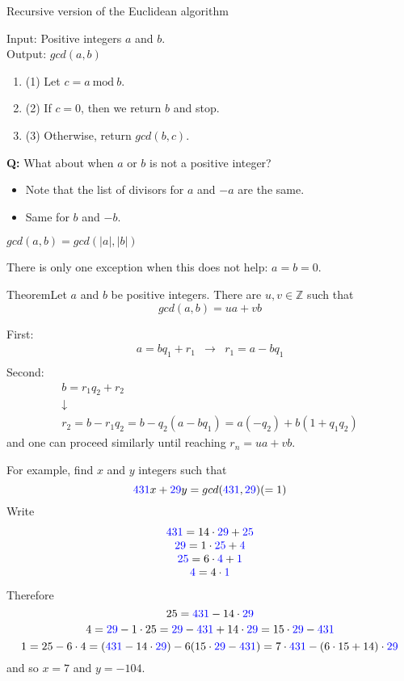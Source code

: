 \documentclass{beamer}
\def\bl[#1]#2{\begin{block}{#1}#2\end{block}}
\def\enumb{\begin{enumerate}}
\def\enume{\end{enumerate}}
\def\itemb{\begin{itemize}}
\def\iteme{\end{itemize}}
\def\mod{~\textrm{mod}~}
\begin{document}
\begin{frame}{Recursive version of the Euclidean algorithm}
\bl[]{
Input: Positive integers $a$ and $b$.\\
Output: $gcd(a,b)$
\enumb
\item[(1)] Let $c= a\mod b$.
\item[(2)] If $c=0$, then we return $b$ and stop.
\item[(3)] Otherwise, return $gcd(b,c)$.
\enume}

\textbf{Q:} What about when $a$ or $b$ is not a positive integer?
\itemb
\item Note that the list of divisors for $a$ and $-a$ are the same.
\item Same for $b$ and $-b$. 
\iteme
\bl[]{$gcd(a,b)=gcd(|a|,|b|)$}
There is only one exception when this does not help: $a=b=0$.
\end{frame}

\begin{frame}
\bl[Theorem]{Let $a$ and $b$ be positive integers. There are $u,v\in\mathbb{Z}$ such that 
\[
gcd(a,b)=ua+vb
\]}
First:
\[
\begin{array}{cccc}
a=bq_1+r_1&\to&r_1=a-bq_1\\
\end{array}
\]
Second:
\[
\begin{array}{c}
b=r_1q_2+r_2\\
\downarrow\\
r_2=b-r_1q_2=b-q_2(a-bq_1)=a(-q_2)+b(1+q_1q_2)
\end{array}
\]
and one can proceed similarly until reaching $r_n=ua+vb$.
\end{frame}

\begin{frame}
For example, find $x$ and $y$ integers such that
\[
\textcolor{blue}{431}x+\textcolor{blue}{29}y=gcd(\textcolor{blue}{431},\textcolor{blue}{29})(=1)
\]
Write
\[
\begin{array}{c}
\textcolor{blue}{431}=14\cdot \textcolor{blue}{29}+\textcolor{blue}{25}\\
\textcolor{blue}{29}=1\cdot \textcolor{blue}{25}+\textcolor{blue}{4}\\
\textcolor{blue}{25}=6\cdot \textcolor{blue}{4}+\textcolor{blue}{1}\\
\textcolor{blue}{4}=4\cdot \textcolor{blue} {1}
\end{array}
\]
Therefore 
\[
25=\textcolor{blue}{431}-14\cdot \textcolor{blue}{29}
\]
\[
4=\textcolor{blue}{29}-1\cdot 25=\textcolor{blue}{29}-\textcolor{blue}{431}+14\cdot \textcolor{blue}{29}=15\cdot\textcolor{blue}{29}-\textcolor{blue}{431}
\]
\[
1=25-6\cdot 4=(\textcolor{blue}{431}-14\cdot \textcolor{blue}{29})-6(15\cdot \textcolor{blue}{29}-\textcolor{blue}{431})=7\cdot \textcolor{blue}{431}-(6\cdot 15+14)\cdot \textcolor{blue}{29}
\]
and so $x=7$ and $y=-104$.
\end{frame}
\end{document}

